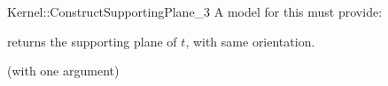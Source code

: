 \begin{ccRefFunctionObjectConcept}{Kernel::ConstructSupportingPlane_3}
A model for this must provide:


       {returns the supporting plane of $t$, with same orientation.}

\ccRefines
{} (with one argument)

\ccSeeAlso
{} 

\end{ccRefFunctionObjectConcept}

